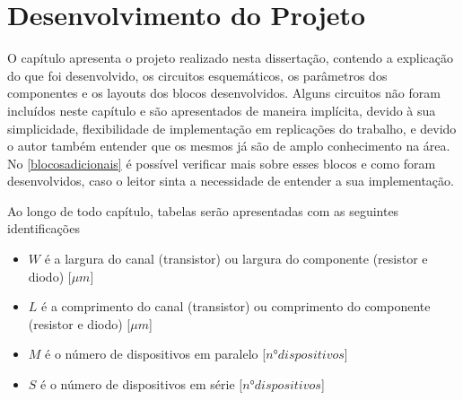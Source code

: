 \chapter[Desenvolvimento do Projeto]{Desenvolvimento do Projeto}

O capítulo apresenta o projeto realizado nesta dissertação, contendo a explicação do que foi desenvolvido, os circuitos esquemáticos, os parâmetros dos componentes e os layouts dos blocos desenvolvidos. Alguns circuitos não foram incluídos neste capítulo e são apresentados de maneira implícita, devido à sua simplicidade, flexibilidade de implementação em replicações do trabalho, e devido o autor também entender que os mesmos já são de amplo conhecimento na área. No \autoref{blocosadicionais} é possível verificar mais sobre esses blocos e como foram desenvolvidos, caso o leitor sinta a necessidade de entender a sua implementação.

Ao longo de todo capítulo, tabelas serão apresentadas com as seguintes identificações

\begin{itemize}
\item $W$ é a largura do canal (transistor) ou largura do componente (resistor e diodo) [${\mu}m$]
\item $L$ é a comprimento do canal (transistor) ou comprimento do componente (resistor e diodo) [${\mu}m$]
\item $M$ é o número de dispositivos em paralelo [$n$°$ dispositivos$]
\item $S$ é o número de dispositivos em série [$n$°$ dispositivos$]
\end{itemize}

\newcommand{\NomeBloco}{NULL}
\newcommand{\NomeBlocoNoIt}{NULL}
\newcommand{\NomeBlocoNoUnderline}{NULL}
\newcommand{\NomePTab}{tab_\NomeBlocoNoUnderline}
\newcommand{\NomeSTab}{tab_\NomeBlocoNoUnderline2}
\newcommand{\NomePFig}{fig_\NomeBlocoNoUnderline}
\newcommand{\NomeSFig}{fig_\NomeBlocoNoUnderline2}
\newcommand{\NomeTTab}{tab_\NomeBlocoNoUnderline3}
\newcommand{\NomeQTab}{tab_\NomeBlocoNoUnderline4}














